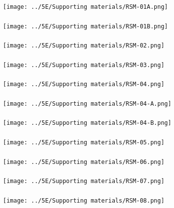 \begin{frame}\frametitle{}
	\centerline{\texttt{[image: ../5E/Supporting materials/RSM-01A.png]}}
\end{frame}
\begin{frame}\frametitle{}
	\centerline{\texttt{[image: ../5E/Supporting materials/RSM-01B.png]}}
\end{frame}
\begin{frame}\frametitle{}
	\centerline{\texttt{[image: ../5E/Supporting materials/RSM-02.png]}}
\end{frame}
\begin{frame}\frametitle{}
	\centerline{\texttt{[image: ../5E/Supporting materials/RSM-03.png]}}
\end{frame}
\begin{frame}\frametitle{}
	\centerline{\texttt{[image: ../5E/Supporting materials/RSM-04.png]}}
\end{frame}
\begin{frame}\frametitle{}
	\centerline{\texttt{[image: ../5E/Supporting materials/RSM-04-A.png]}}
\end{frame}
\begin{frame}\frametitle{}
	\centerline{\texttt{[image: ../5E/Supporting materials/RSM-04-B.png]}}
\end{frame}
\begin{frame}\frametitle{}
	\centerline{\texttt{[image: ../5E/Supporting materials/RSM-05.png]}}
\end{frame}
\begin{frame}\frametitle{}
	\centerline{\texttt{[image: ../5E/Supporting materials/RSM-06.png]}}
\end{frame}
\begin{frame}\frametitle{}
	\centerline{\texttt{[image: ../5E/Supporting materials/RSM-07.png]}}
\end{frame}
\begin{frame}\frametitle{}
	\centerline{\texttt{[image: ../5E/Supporting materials/RSM-08.png]}}
\end{frame}

